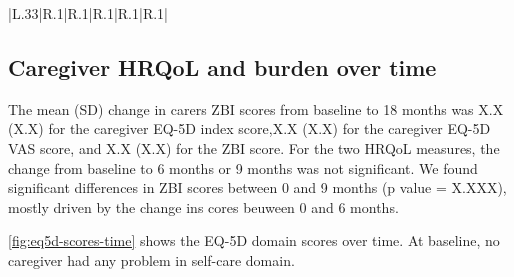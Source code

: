 \documentclass[12pt]{article}
\begin{document}
\begin{table}[H]
    \centering \singlespacing \small
    \caption{Pooled carer ZBI, EQ-VAS, and EQ-5D utility and domain scores by King’s stage}
    \begin{tabular}{|L{.33\linewidth}|R{.1\linewidth}|R{.1\linewidth}|R{.1\linewidth}|R{.1\linewidth}|R{.1\linewidth}|}
        \hline
    \end{tabular}
    \label{tab_outcomes_kings}
    \caption*{\footnotesize 
                \textit{Notes:} Data from all caregivers at all time points (baseline, 6 months, and 9 months) have been pooled. Comparisons of outcomes between King’s stages use ANOVA. ZBI total score ranges from 0 to 88, with higher scores indicating greater burden. EQ-5D scores range from 0 to 1.0, with higher scores indicating better health-related quality of life. EQ-VAS scores range from 0 to 100, with higher scores indicate better health-related quality of life. EQ-5D domain scores range from 0 to 3, with higher scores indicating greater restriction by domain. \\
                ANOVA, analysis of variance; EQ-5D, EuroQol 5-dimension questionnaire; VAS, visual analog scale; ZBI, Zarit Burden Interview}
\end{table}

\subsection{Caregiver HRQoL and burden over time}
The mean (SD) change in carers ZBI scores from baseline to 18 months was X.X (X.X) for the caregiver EQ-5D index score,X.X (X.X) for the caregiver EQ-5D VAS score, and X.X (X.X) for the ZBI score. For the two HRQoL measures, the change from baseline to 6 months or 9 months was not significant. We found significant differences in ZBI scores between 0 and 9  months (p value = X.XXX), mostly driven by the change ins cores beuween 0 and 6 months. 

\autoref{fig:eq5d-scores-time} shows the EQ-5D domain scores over time. At baseline, no caregiver had any problem in self-care domain. %
\end{document}
